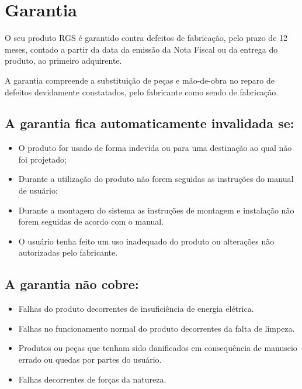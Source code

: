 \chapter{Garantia}

\par O seu produto RGS é garantido contra defeitos de fabricação, pelo
prazo de 12 meses, contado a partir da data da emissão da Nota Fiscal ou da entrega do produto, ao primeiro adquirente.

\par A garantia compreende a substituição de peças e mão-de-obra no reparo de defeitos devidamente constatados, pelo fabricante como sendo de fabricação.

\section*{A garantia fica automaticamente invalidada se:}

\begin{itemize}
\item O produto for usado de forma indevida ou para uma destinação ao qual não foi projetado;
\item Durante a utilização do produto não forem seguidas as instruções do manual de usuário;
\item Durante a montagem do sistema as instruções de montagem e instalação não forem seguidas de acordo com o manual.
\item O usuário tenha feito um uso inadequado do produto ou alterações não autorizadas pelo fabricante.
\end{itemize}


\section*{A garantia não cobre:}

\begin{itemize}
\item Falhas do produto decorrentes de insuficiência de energia elétrica.
\item Falhas no funcionamento normal do produto decorrentes da falta de limpeza.
\item Produtos ou peças que tenham sido danificados em consequência de manuseio errado ou quedas por partes do usuário.
\item Falhas decorrentes de forças da natureza.
\end{itemize}



